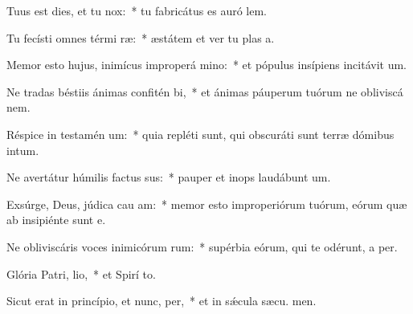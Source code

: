 \item Tuus est dies, et tu  nox:~* tu fabricátus es auró  lem.
\item Tu fecísti omnes térmi ræ:~* æstátem et ver tu plas a.
\item Memor esto hujus, inimícus improperá mino:~* et pópulus insípiens incitávit  um.
\item Ne tradas béstiis ánimas confitén bi,~* et ánimas páuperum tuórum ne obliviscá  nem.
\item Réspice in testamén um:~* quia repléti sunt, qui obscuráti sunt terræ dómibus intum.
\item Ne avertátur húmilis factus sus:~* pauper et inops laudábunt  um.
\item Exsúrge, Deus, júdica cau am:~* memor esto improperiórum tuórum, eórum quæ ab insipiénte sunt  e.
\item Ne obliviscáris voces inimicórum rum:~* supérbia eórum, qui te odérunt, a per.
\item Glória Patri,  lio,~* et Spirí to.
\item Sicut erat in princípio, et nunc,  per,~* et in sǽcula sæcu. men.
